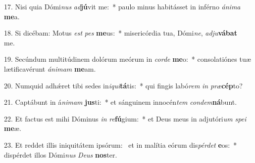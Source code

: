 17. Nisi quia Dómi\textit{nus} \textit{ad}\textbf{jú}vit me:~*  paulo minus habitásset in inférno \textit{á}\textit{ni}\textit{ma} \textbf{me}a.\

18. Si dicébam: Motus \textit{est} \textit{pes} \textbf{me}us:~*  misericórdia tua, Dómi\textit{ne}, \textit{ad}\textit{ju}\textbf{vá}\textbf{bat} me.\

19. Secúndum multitúdinem dolórum meórum in \textit{cor}\textit{de} \textbf{me}o:~*  consolatiónes tuæ lætificavérunt \textit{á}\textit{ni}\textit{mam} \textbf{me}am.\

20. Numquid adhǽret tibi sedes in\textit{i}\textit{qui}\textbf{tá}tis:~*  qui fingis labó\textit{rem} \textit{in} \textit{præ}\textbf{cép}to?\

21. Captábunt in á\textit{ni}\textit{mam} \textbf{jus}ti:~*  et sánguinem innocén\textit{tem} \textit{con}\textit{dem}\textbf{ná}bunt.\

22. Et factus est mihi Dóminus \textit{in} \textit{re}\textbf{fú}gium:~*  et Deus meus in adjutóri\textit{um} \textit{spe}\textit{i} \textbf{me}æ.\

23. Et reddet illis iniquitátem ipsórum: \dag\  et in malítia eórum dis\textit{pér}\textit{det} \textbf{e}os:~*  dispérdet illos Dómi\textit{nus} \textit{De}\textit{us} \textbf{nos}ter.\

